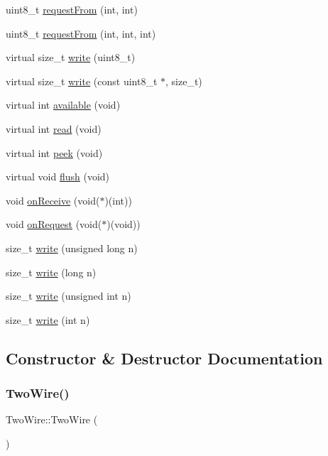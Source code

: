\begin{DoxyCompactItemize}
\item 
uint8\+\_\+t \hyperlink{class_two_wire_ad40a27213d0bb32f7b819aa8962fccd3}{request\+From} (int, int)
\item 
uint8\+\_\+t \hyperlink{class_two_wire_a3d76da36fb8571e0b5e8310e9f86f6fe}{request\+From} (int, int, int)
\item 
virtual size\+\_\+t \hyperlink{class_two_wire_a318b7bec156c1f1075a818c0ad3427d7}{write} (uint8\+\_\+t)
\item 
virtual size\+\_\+t \hyperlink{class_two_wire_a1957b4d5a6a997bdde436e9e40d131a7}{write} (const uint8\+\_\+t $\ast$, size\+\_\+t)
\item 
virtual int \hyperlink{class_two_wire_aee57bc52bee06508e231c5fc6bc35ada}{available} (void)
\item 
virtual int \hyperlink{class_two_wire_aa361b83500d00dfb93bb25b6473b33e9}{read} (void)
\item 
virtual int \hyperlink{class_two_wire_a5bd64cb7bd609e9470a15d96a0991ec8}{peek} (void)
\item 
virtual void \hyperlink{class_two_wire_a4d92ddf6ca349c815de1de15fca06b5e}{flush} (void)
\item 
void \hyperlink{class_two_wire_a860d97eb825c6fdca388f2f0577cc34a}{on\+Receive} (void($\ast$)(int))
\item 
void \hyperlink{class_two_wire_a224bf8799dda398fc0db223801852ca5}{on\+Request} (void($\ast$)(void))
\item 
size\+\_\+t \hyperlink{class_two_wire_a0c9d09ead8fcddf2a84781fe77d3c975}{write} (unsigned long n)
\item 
size\+\_\+t \hyperlink{class_two_wire_a55a9894186458e43852f6fb7c59bb066}{write} (long n)
\item 
size\+\_\+t \hyperlink{class_two_wire_afdb917746ee37f72e7452b4782e9527b}{write} (unsigned int n)
\item 
size\+\_\+t \hyperlink{class_two_wire_a8ec34b0d2a75e8b2751eb9f4332bd7c3}{write} (int n)
\end{DoxyCompactItemize}


\subsection{Constructor \& Destructor Documentation}
\mbox{\label{class_two_wire_a4c7daf378c06e5e72762e1bd3d5937b6}} 
\subsubsection{\texorpdfstring{Two\+Wire()}{TwoWire()}}
{\footnotesize\ttfamily Two\+Wire\+::\+Two\+Wire (\begin{DoxyParamCaption}{ }\end{DoxyParamCaption})}



